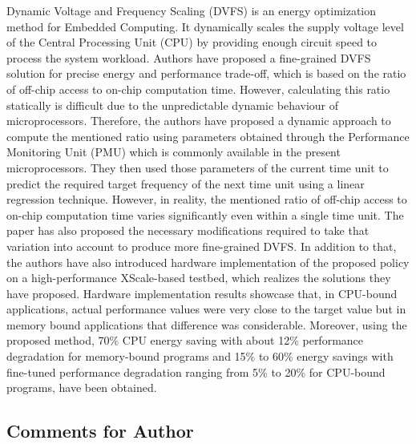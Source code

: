 \documentclass[11pt,letterpaper]{article}
\begin{document}
	
	Dynamic Voltage and Frequency Scaling (DVFS) is an energy optimization method for Embedded Computing. It dynamically scales the supply voltage level of the Central Processing Unit (CPU) by providing enough circuit speed to process the system workload. Authors have proposed a fine-grained DVFS solution for precise energy and performance trade-off, which is based on the ratio of off-chip access to on-chip computation time. However, calculating this ratio statically is difficult due to the unpredictable dynamic behaviour of microprocessors. Therefore, the authors have proposed a dynamic approach to compute the mentioned ratio using parameters obtained through the Performance Monitoring Unit (PMU) which is commonly available in the present microprocessors. They then used those parameters of the current time unit to predict the required target frequency of the next time unit using a linear regression technique. However, in reality, the mentioned ratio of off-chip access to on-chip computation time varies significantly even within a single time unit. The paper has also proposed the necessary modifications required to take that variation into account to produce more fine-grained DVFS. In addition to that, the authors have also introduced hardware implementation of the proposed policy on a high-performance XScale-based testbed,  which realizes the solutions they have proposed. Hardware implementation results showcase that, in CPU-bound applications, actual performance values were very close to the target value but in memory bound applications that difference was considerable. Moreover, using the proposed method, 70\% CPU energy saving with about 12\% performance degradation for memory-bound programs and 15\% to 60\% energy savings with fine-tuned performance degradation ranging from 5\% to 20\% for CPU-bound programs, have been obtained.  
	
	
	
	\subsection*{Comments for Author}
	
\end{document}
